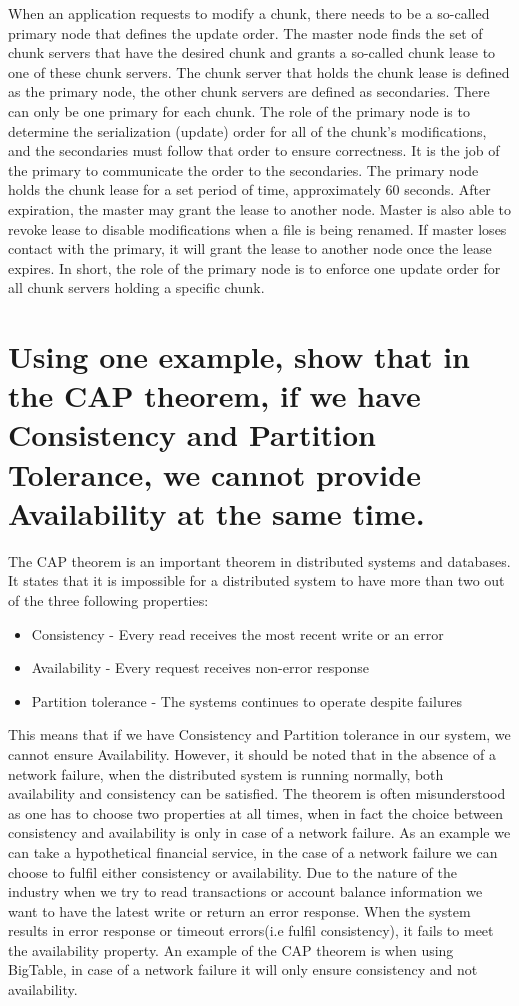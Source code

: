 \documentclass{article}
\begin{document}
When an application requests to modify a chunk, there needs to be a so-called primary node that defines the update order. The master  node finds the set of chunk servers that have the desired chunk and grants a so-called chunk lease to one of these chunk servers.  The chunk server that holds the chunk lease is defined as the primary node, the other chunk servers are defined as secondaries. There can only be one primary for each chunk. The role of the primary node is to determine the serialization (update) order for all of the chunk’s modifications, and the secondaries must follow that order to ensure correctness. It is the job of the primary to communicate the order to the secondaries. The primary node holds the chunk lease for a set period of time, approximately 60 seconds. After expiration, the master may grant the lease to another node. Master is also able to revoke lease to disable modifications when a file is being renamed. If master loses contact with the primary, it will grant the lease to another node once the  lease expires.  In short,  the  role of the primary node is to enforce one update order for all chunk servers holding a specific chunk. 

\section{Using one example, show that in the CAP theorem, if we have Consistency and Partition Tolerance, we cannot provide Availability at the same time.}

The CAP theorem is an important  theorem in distributed systems and databases. It states that it is impossible for a distributed system to have more than two out of the three following properties: 

\begin{itemize}
    \item Consistency - Every read receives the most recent write or an error
    \item Availability - Every request receives non-error response
    \item Partition tolerance - The systems continues to operate despite failures 
\end{itemize}

This means that if we have Consistency and Partition tolerance in our system, we cannot ensure Availability. However, it should be noted that in the absence of a network failure, when the distributed system is running normally, both availability and consistency can be satisfied. The theorem is often misunderstood as one has to choose two properties at all times, when in fact the choice between consistency and availability is only in case of a network failure. As an example we can take a hypothetical financial service, in the case of a network failure we can choose to fulfil either consistency or availability. Due to the nature of the industry when we try to read transactions or account balance information we want to have the latest write or return an error response. When the system results in error response or timeout errors(i.e fulfil consistency), it fails to meet the availability property. An example of the CAP theorem is when using BigTable, in case of a network failure it will only ensure consistency and not availability. 
\end{document}
